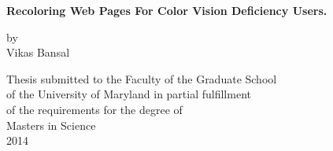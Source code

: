 \begin{titlepage}
\mbox{}\vspace{1in}
\begin{center}

    {\Large \bf Recoloring Web Pages For Color Vision Deficiency Users. \par}
    
\vspace{2in}

    {\large by} \\
    {\large Vikas Bansal}
    
\vspace{2in}

  \begin{singlespace}
    Thesis submitted to the Faculty of the Graduate School \\
    of the University of Maryland in partial fulfillment \\
    of the requirements for the degree of \\
    Masters in Science \\
    2014
	\end{singlespace}
\end{center}
\end{titlepage}
